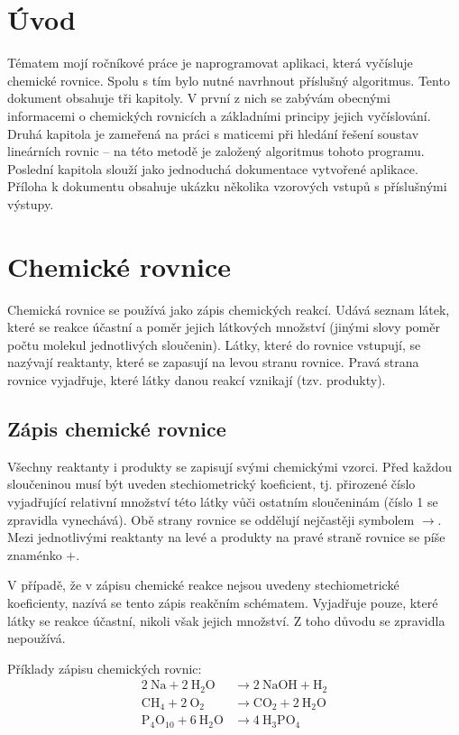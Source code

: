 \documentclass[12pt,a4paper]{report}
\newcommand{\s}{$ \rightarrow $}
\newcommand{\n}[1]{\mbox{#1}}
\newcommand{\sipka}{\rightarrow}
\begin{document}


\tableofcontents

\chapter{Úvod}
Tématem mojí ročníkové práce je naprogramovat aplikaci, která vyčísluje chemické rovnice. Spolu s tím bylo nutné navrhnout příslušný algoritmus. Tento dokument obsahuje tři kapitoly. V první z nich se zabývám obecnými informacemi o chemických rovnicích a základními principy jejich vyčíslování. Druhá kapitola je zameřená na práci s maticemi při hledání řešení soustav lineárních rovnic -- na této metodě je založený algoritmus tohoto programu. Poslední kapitola slouží jako jednoduchá dokumentace vytvořené aplikace. Příloha k dokumentu obsahuje ukázku několika vzorových vstupů s příslušnými výstupy.

\chapter{Chemické rovnice}
Chemická rovnice se používá jako zápis chemických reakcí. Udává seznam látek, které se reakce účastní a poměr jejich látkových množství (jinými slovy poměr počtu molekul jednotlivých sloučenin). Látky, které do rovnice vstupují, se nazývají reaktanty, které se zapasují na levou stranu rovnice. Pravá strana rovnice vyjadřuje, které látky danou reakcí vznikají (tzv. produkty).

\section{Zápis chemické rovnice}
Všechny reaktanty i produkty se zapisují svými chemickými vzorci. Před každou sloučeninou musí být uveden stechiometrický koeficient, tj. přirozené číslo vyjadřující relativní množství této látky vůči ostatním sloučeninám (číslo 1 se zpravidla vynechává). Obě strany rovnice se oddělují nejčastěji symbolem \s. Mezi jednotlivými reaktanty na levé a produkty na pravé straně rovnice se píše znaménko $ + $.

V případě, že v zápisu chemické reakce nejsou uvedeny stechiometrické koeficienty, nazívá se tento zápis reakčním schématem. Vyjadřuje pouze, které látky se reakce účastní, nikoli však jejich množství. Z toho důvodu se zpravidla nepoužívá.

Příklady zápisu chemických rovnic:
\begin{align*}
 	2~\n{Na} + 2~\n{H}_2\n{O} &\sipka 2~\n{NaOH}+\n{H}_2\\
 	\n{CH}_4 + 2~\n{O}_2 &\sipka \n{CO}_2 + 2~\n{H}_2\n{O}\\
 	\n{P}_4\n{O}_{10} + 6~\n{H}_2\n{O} &\sipka 4~\n{H}_3\n{PO}_4
\end{align*}
\end{document}
